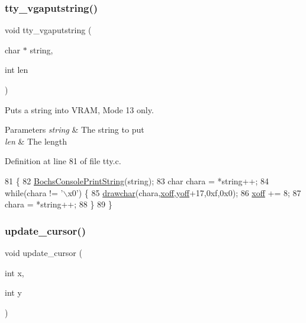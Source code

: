 \subsubsection{\texorpdfstring{tty\+\_\+vgaputstring()}{tty\_vgaputstring()}}
{\footnotesize\ttfamily void tty\+\_\+vgaputstring (\begin{DoxyParamCaption}\item[{char $\ast$}]{string,  }\item[{int}]{len }\end{DoxyParamCaption})}



Puts a string into V\+R\+AM, Mode 13 only. 


\begin{DoxyParams}{Parameters}
{\em string} & The string to put \\
\hline
{\em len} & The length \\
\hline
\end{DoxyParams}


Definition at line 81 of file tty.\+c.


\begin{DoxyCode}
81                                              \{
82     \hyperlink{a00065_a19e1f554d03c977f8b947f21489daa41_a19e1f554d03c977f8b947f21489daa41}{BochsConsolePrintString}(\textcolor{keywordtype}{string});
83     \textcolor{keywordtype}{char} chara = *\textcolor{keywordtype}{string}++;
84     \textcolor{keywordflow}{while}(chara != \textcolor{stringliteral}{'\(\backslash\)x0'}) \{
85         \hyperlink{a00050_a2c8df7a20b47341b70d97a7ff21d86ea_a2c8df7a20b47341b70d97a7ff21d86ea}{drawchar}(chara,\hyperlink{a00149_abaa0d20f0e52ce0d3a7d706f6ac16266_abaa0d20f0e52ce0d3a7d706f6ac16266}{xoff},\hyperlink{a00149_a1a7539764d0ae8cd06ce45c62cf92bca_a1a7539764d0ae8cd06ce45c62cf92bca}{yoff}+17,0xf,0x0);
86         \hyperlink{a00149_abaa0d20f0e52ce0d3a7d706f6ac16266_abaa0d20f0e52ce0d3a7d706f6ac16266}{xoff} += 8;
87         chara = *\textcolor{keywordtype}{string}++;
88     \}
89 \}
\end{DoxyCode}
\mbox{\label{a00149_a492f5021d7340613e732ef37bbaa04e4_a492f5021d7340613e732ef37bbaa04e4}} 
\subsubsection{\texorpdfstring{update\+\_\+cursor()}{update\_cursor()}}
{\footnotesize\ttfamily void update\+\_\+cursor (\begin{DoxyParamCaption}\item[{int}]{x,  }\item[{int}]{y }\end{DoxyParamCaption})}



